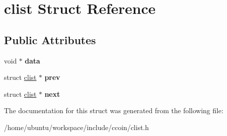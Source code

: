 \hypertarget{structclist}{\section{clist Struct Reference}
\label{structclist}
}
\subsection*{Public Attributes}
\begin{DoxyCompactItemize}
\item 
\hypertarget{structclist_adef29b0cc7e571800ffff37413d614a0}{void $\ast$ {\bfseries data}}\label{structclist_adef29b0cc7e571800ffff37413d614a0}

\item 
\hypertarget{structclist_a1874d4993135e0158648cd60628d5201}{struct \hyperlink{structclist}{clist} $\ast$ {\bfseries prev}}\label{structclist_a1874d4993135e0158648cd60628d5201}

\item 
\hypertarget{structclist_adef7ebb8bca9f90b406a3639cbb80223}{struct \hyperlink{structclist}{clist} $\ast$ {\bfseries next}}\label{structclist_adef7ebb8bca9f90b406a3639cbb80223}

\end{DoxyCompactItemize}


The documentation for this struct was generated from the following file\-:\begin{DoxyCompactItemize}
\item 
/home/ubuntu/workspace/include/ccoin/clist.\-h\end{DoxyCompactItemize}

